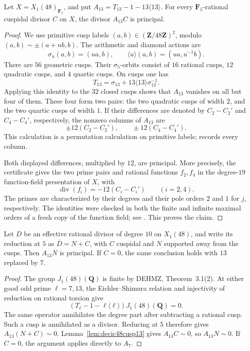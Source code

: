 \begin{lemma}\label{lem:decic48cusp13}
Let $X=X_1(48)_{\mathbf F_5}$, and put
$A_{13}=T_{13}-1-13\langle13\rangle$.
For every $\mathbf F_5$-rational cuspidal divisor $C$ on $X$, the divisor
$A_{13}C$ is principal.
\end{lemma}
\begin{proof}
We use primitive cusp labels $(a,b)\in(\mathbf Z/48\mathbf Z)^2$, modulo
$(a,b)\sim\pm(a+nb,b)$. The arithmetic and diamond actions are
\[
 \sigma_u(a,b)=(ua,b),\qquad
 \langle u\rangle(a,b)=(ua,u^{-1}b).
\]
There are $56$ geometric cusps. Their $\sigma_5$-orbits consist of
$16$ rational cusps, $12$ quadratic cusps, and $4$ quartic cusps.
On cusps one has
\[
 T_{13}=\sigma_{13}+13\langle13\rangle\sigma_{13}^{-1}.
\]
Applying this identity to the $32$ closed cusps shows that $A_{13}$ vanishes
on all but four of them. These four form two pairs: the two quadratic
cusps of width $2$, and the two quartic cusps of width $1$.
If their differences are denoted by $C_2-C_2'$ and $C_4-C_4'$, respectively,
the nonzero columns of $A_{13}$ are
\[
 \pm12(C_2-C_2'),\qquad \pm12(C_4-C_4').
\]
This calculation is a permutation calculation on primitive labels;
 records every column.

Both displayed differences, multiplied by $12$, are principal. More
precisely, the certificate  gives the two
prime pairs and rational functions $f_2,f_4$ in the degree-$19$
function-field presentation of $X$, with
\[
 \operatorname{div}(f_i)=-12(C_i-C_i')\qquad(i=2,4).
\]
The primes are characterized by their degrees and their pole orders
$2$ and $1$ for $j$, respectively. The identities were checked in both
the finite and infinite maximal orders of a fresh copy of the function
field; see . This proves the claim.
\end{proof}

\begin{lemma}\label{lem:decic48NC13}
Let $D$ be an effective rational divisor of degree $10$ on $X_1(48)$,
and write its reduction at $5$ as $\overline D=N+C$, with $C$ cuspidal
and $N$ supported away from the cusps. Then $A_{13}N$ is principal.
If $C=0$, the same conclusion holds with $13$ replaced by $7$.
\end{lemma}
\begin{proof}
The group $J_1(48)(\mathbf Q)$ is finite by DEHMZ, Theorem~3.1(2).
At either good odd prime $\ell=7,13$, the Eichler--Shimura relation and
injectivity of reduction on rational torsion give
\[
 (T_\ell-1-\ell\langle\ell\rangle)J_1(48)(\mathbf Q)=0.
\]
The same operator annihilates the degree part after subtracting a rational
cusp. Such a cusp is annihilated as a divisor. Reducing at $5$ therefore
gives $A_{13}(N+C)\sim0$. Lemma~\ref{lem:decic48cusp13} gives
$A_{13}C\sim0$, so $A_{13}N\sim0$. If $C=0$, the argument applies
directly to $A_7$.
\end{proof}
